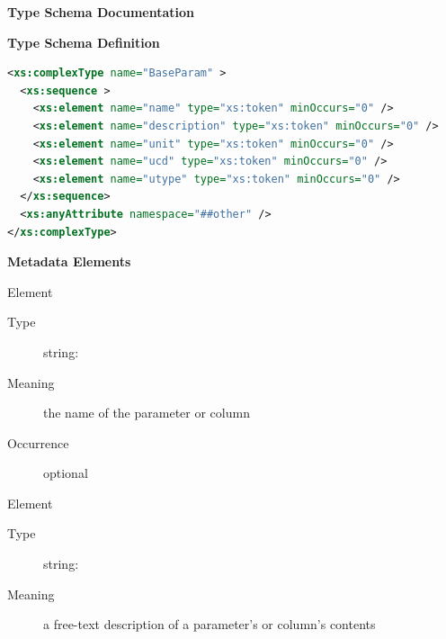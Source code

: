 \documentclass[11pt,a4paper]{ivoa}
\begin{document}
\begin{generated}
\begingroup
      	\renewcommand*\descriptionlabel[1]{%
      	\hbox to 5.5em{\emph{#1}\hfil}}\vspace{2ex}\noindent\textbf{ Type Schema Documentation}



\vspace{1ex}\noindent\textbf{ Type Schema Definition}

\begin{lstlisting}[language=XML,basicstyle=\footnotesize]
<xs:complexType name="BaseParam" >
  <xs:sequence >
    <xs:element name="name" type="xs:token" minOccurs="0" />
    <xs:element name="description" type="xs:token" minOccurs="0" />
    <xs:element name="unit" type="xs:token" minOccurs="0" />
    <xs:element name="ucd" type="xs:token" minOccurs="0" />
    <xs:element name="utype" type="xs:token" minOccurs="0" />
  </xs:sequence>
  <xs:anyAttribute namespace="##other" />
</xs:complexType>
\end{lstlisting}

\vspace{0.5ex}\noindent\textbf{ Metadata Elements}

\begingroup\small\begin{bigdescription}\item[Element \xmlel{name}]
\begin{description}
\item[Type] string: 
\item[Meaning] 
                  the name of the parameter or column
               
\item[Occurrence] optional

\end{description}
\item[Element \xmlel{description}]
\begin{description}
\item[Type] string: 
\item[Meaning] 
                  a free-text description of a parameter's or column's 
                  contents
               

\end{description}
\end{bigdescription}
\end{generated}
\end{document}
